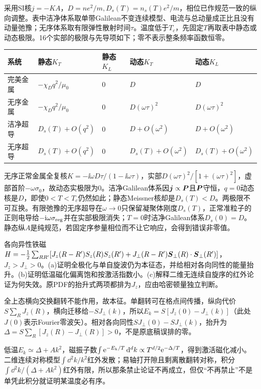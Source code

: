 \begin{solution}
采用SI核$j=-KA$，$D=ne^2/m,D_s(T)=n_s(T)e^2/m$，相位已作规范一致的纵向调整。表中洁净体系取单带Galilean不变连续模型、电流与总动量成正比且没有动量弛豫；无序体系取有限弹性散射时间$\tau$。温度低于$T_c$，先固定$T$再取表中静态或动态极限。16个实部的极限与先导项如下；零不表示整条频率函数恒零。
\begin{center}\begin{tabular}{lllll}\toprule 系统&静态$K_T$&静态$K_L$&动态$K_T$&动态$K_L$\\\midrule
完美金属&$-\chi_Dq^2/\mu_0$&0&$D$&$D$\\
无序金属&$-\chi_Dq^2/\mu_0$&0&$D(\omega\tau)^2$&$D(\omega\tau)^2$\\
洁净超导&$D_s(T)+O(q^2)$&0&$D+O(\omega^2)$&$D+O(\omega^2)$\\
无序超导&$D_s(T)+O(q^2)$&0&$D_s(T)+O(\omega^2)$&$D_s(T)+O(\omega^2)$\\\bottomrule\end{tabular}\end{center}
无序正常金属全复核$K=-\ii\omega D\tau/(1-\ii\omega\tau)$，实部$D(\omega\tau)^2/[1+(\omega\tau)^2]$，虚部首阶$-\omega\sigma_0$，故动态实极限为0。洁净Galilean体系因$\boldsymbol{j}\propto\boldsymbol{P}$且$\boldsymbol{P}$守恒，$q=0$动态核是$D$，即使$0<T<T_c$仍然如此；静态Meissner核却是$D_s(T)<D$。两极限不可互换。有限弛豫的无序超导在$\omega\to0$只保留凝聚体刚度$D_s(T)$，正常准粒子的正则电导给$-\mathrm i\omega\sigma_{\rm reg}$并在实部极限消失；$T=0$时洁净Galilean体系$D_s(0)=D$。静态纵$A$是纯规范，若固定序参量相位而不让它响应，会得到错误非零值。
\end{solution}
\begin{exercise}
各向异性铁磁$H=-\frac12\sum_{RR'}[J_z(R-R')S_z(R)S_z(R')+J_\perp(R-R')\boldsymbol{S}_\perp(R)\cdot\boldsymbol{S}_\perp(R')]$，$J_z>J_\perp>0$。(a)证明全极化与单自旋波仍为本征态，并给相对各向同性的能量抬升。(b)证明低温磁化偏离饱和按激活指数小。(c)解释二维无连续自旋序的红外论证为何失效。原PDF的抬升式两项都排为$J_z$，应由哈密顿量独立判断。
\end{exercise}
\begin{solution}
全上态横向交换翻转不能作用，故本征。单翻转可在格点间传播，纵向代价$S\sum_RJ_z(R)$，横向迁移给$-SJ_\perp(k)$，所以$E_k=S[J_z(0)-J_\perp(k)]$（此处$J(0)$表示Fourier零波矢）。相对各向同性$SJ_\perp(0)-SJ_\perp(k)$，抬升为$\Delta=S\sum_R[J_z(R)-J_\perp(R)]>0$，不是原底稿误排的零。

低温$E_k\simeq\Delta+Ak^2$，磁振子数$\int\mathrm e^{-E_k/T}\,\mathrm d^dk\propto T^{d/2}\mathrm e^{-\Delta/T}$，得到激活磁化减小。二维连续对称模型$\int\dd^2k/k^2$红外发散；易轴打开隙且剩离散翻转对称，积分$\int\dd^2k/(\Delta+Ak^2)$红外有限，所以那条禁止论证不再成立，但仅“不再禁止”不是单凭此积分就证明某温度必有序。
\end{solution}
